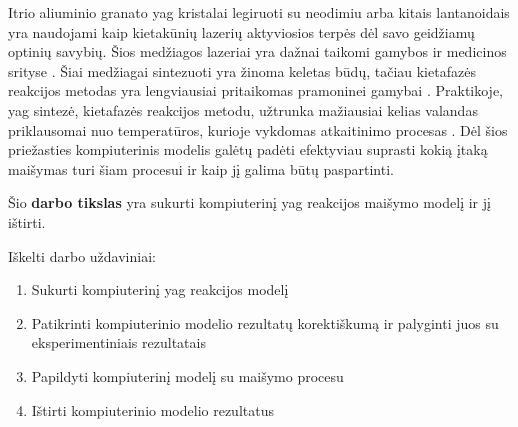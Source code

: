 




Itrio aliuminio granato \acs{yag} kristalai legiruoti su neodimiu arba kitais lantanoidais yra naudojami kaip kietakūnių lazerių aktyviosios terpės dėl savo geidžiamų optinių savybių. Šios medžiagos lazeriai yra dažnai taikomi gamybos ir medicinos srityse \cite{dubeyExperimentalStudyNd2008, valentiUseErYAG2021}. Šiai medžiagai sintezuoti yra žinoma keletas būdų, tačiau kietafazės reakcijos metodas yra lengviausiai pritaikomas pramoninei gamybai \cite{bhattacharyyaMethodsSynthesisY3AI5O122007}. Praktikoje, \acs{yag} sintezė, kietafazės reakcijos metodu, užtrunka mažiausiai kelias valandas priklausomai nuo temperatūros, kurioje vykdomas atkaitinimo procesas \cite{mackeviciusCloserLookComputer2012}. Dėl šios priežasties kompiuterinis modelis galėtų padėti efektyviau suprasti kokią įtaką maišymas turi šiam procesui ir kaip jį galima būtų paspartinti.

Šio \textbf{darbo tikslas} yra sukurti kompiuterinį \acs{yag} reakcijos maišymo modelį ir jį ištirti.

Iškelti darbo uždaviniai:

\begin{enumerate}
\item Sukurti kompiuterinį \acs{yag} reakcijos modelį
\item Patikrinti kompiuterinio modelio rezultatų korektiškumą ir palyginti juos su eksperimentiniais rezultatais
\item Papildyti kompiuterinį modelį su maišymo procesu
\item Ištirti kompiuterinio modelio rezultatus
\end{enumerate}